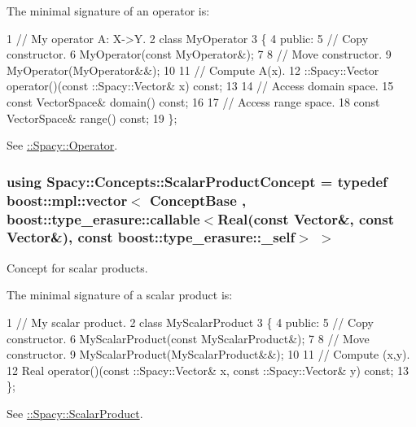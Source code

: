 \label{group__ConceptGroup_ga7d984281b647a6d8e4c0a7ea5faeb90e_OperatorConceptAnchor}%
\hypertarget{group__ConceptGroup_ga7d984281b647a6d8e4c0a7ea5faeb90e_OperatorConceptAnchor}{}%
The minimal signature of an operator is\+: 
\begin{DoxyCode}
1 // My operator A: X->Y.
2 class MyOperator
3 \{
4 public:
5   // Copy constructor.
6   MyOperator(const MyOperator&);
7 
8   // Move constructor.
9   MyOperator(MyOperator&&);
10 
11   // Compute A(x).
12   ::Spacy::Vector operator()(const ::Spacy::Vector& x) const;
13 
14   // Access domain space.
15   const VectorSpace& domain() const;
16 
17   // Access range space.
18   const VectorSpace& range() const;
19 \};
\end{DoxyCode}


See \hyperlink{group__SpacyGroup_ga3f89622eba80cf840b2a7102f1303455_OperatorAnchor}{\+:\+:Spacy\+:\+:Operator}. \hypertarget{group__ConceptGroup_ga1308724cda3078f228fb05c29556805d_ga1308724cda3078f228fb05c29556805d}{}
\subsubsection[{Scalar\+Product\+Concept}]{\setlength{\rightskip}{0pt plus 5cm}using {\bf Spacy\+::\+Concepts\+::\+Scalar\+Product\+Concept} = typedef boost\+::mpl\+::vector$<$ Concept\+Base , boost\+::type\+\_\+erasure\+::callable$<$Real(const Vector\&, const Vector\&), const boost\+::type\+\_\+erasure\+::\+\_\+self$>$ $>$}\label{group__ConceptGroup_ga1308724cda3078f228fb05c29556805d_ga1308724cda3078f228fb05c29556805d}


Concept for scalar products. 

\label{group__ConceptGroup_ga1308724cda3078f228fb05c29556805d_ScalarProductConceptAnchor}%
\hypertarget{group__ConceptGroup_ga1308724cda3078f228fb05c29556805d_ScalarProductConceptAnchor}{}%
The minimal signature of a scalar product is\+: 
\begin{DoxyCode}
1 // My scalar product.
2 class MyScalarProduct
3 \{
4 public:
5   // Copy constructor.
6   MyScalarProduct(const MyScalarProduct&);
7 
8   // Move constructor.
9   MyScalarProduct(MyScalarProduct&&);
10 
11   // Compute (x,y).
12   Real operator()(const ::Spacy::Vector& x, const ::Spacy::Vector& y) const;
13 \};
\end{DoxyCode}


See \hyperlink{group__SpacyGroup_ga9fe0b4de20da1ab1ca3d04a0f96343e1_ScalarProductAnchor}{\+:\+:Spacy\+:\+:Scalar\+Product}. \hypertarget{group__ConceptGroup_ga45ecfe57ffb996aa97c9ff89a647f095_ga45ecfe57ffb996aa97c9ff89a647f095}{}
